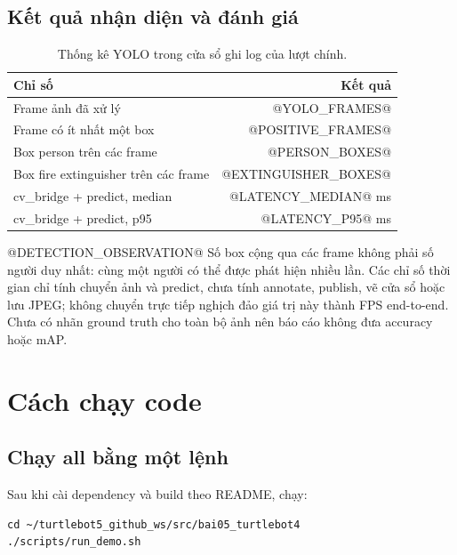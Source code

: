 \documentclass[a4paper,11pt]{article}
\begin{document}
\subsection{Kết quả nhận diện và đánh giá}
\begin{table}[H]\centering\small
\begin{tabular}{@{}lr@{}}\toprule
Chỉ số & Kết quả\\\midrule
Frame ảnh đã xử lý & @YOLO_FRAMES@\\
Frame có ít nhất một box & @POSITIVE_FRAMES@\\
Box person trên các frame & @PERSON_BOXES@\\
Box fire extinguisher trên các frame & @EXTINGUISHER_BOXES@\\
cv\_bridge + predict, median & @LATENCY_MEDIAN@ ms\\
cv\_bridge + predict, p95 & @LATENCY_P95@ ms\\\bottomrule
\end{tabular}
\caption{Thống kê YOLO trong cửa sổ ghi log của lượt chính.}
\end{table}

@DETECTION_OBSERVATION@
Số box cộng qua các frame không phải số người duy nhất: cùng một người có thể
được phát hiện nhiều lần. Các chỉ số thời gian chỉ tính chuyển ảnh và predict,
chưa tính annotate, publish, vẽ cửa sổ hoặc lưu JPEG; không chuyển trực tiếp
nghịch đảo giá trị này thành FPS end-to-end. Chưa có nhãn ground truth cho toàn
bộ ảnh nên báo cáo không đưa accuracy hoặc mAP.

\section{Cách chạy code}
\subsection{Chạy all bằng một lệnh}

Sau khi cài dependency và build theo README, chạy:
\begin{Verbatim}
cd ~/turtlebot5_github_ws/src/bai05_turtlebot4
./scripts/run_demo.sh
\end{Verbatim}
\end{document}
